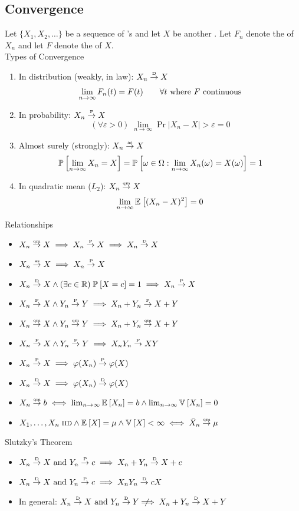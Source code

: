 \documentclass[landscape]{article}
\begin{document}
\begin{multicols*}{2}
\section{Convergence}

Let $\{X_1,X_2,\ldots\}$ be a sequence of \rv's and let $X$ be another \rv.
Let $F_n$ denote the \cdf of $X_n$ and let $F$ denote the \cdf of $X$.\\

Types of Convergence
\begin{enumerate}
  \item In distribution (weakly, in law): $X_n \dconv X$ 
    $$\limn F_n(t) = F(t) \qquad \forall t \text{ where } F \text{ continuous}$$
  \item In probability: $X_n \pconv X$ 
    $$(\forall \varepsilon > 0) \; 
    \lim_{n\to\infty} \Pr{|X_n -X| > \varepsilon} = 0$$
  \item Almost surely (strongly): $X_n \asconv X$
    $$\Pr{\limn X_n=X} = \Pr{\omega\in\Omega: \limn X_n(\omega)=X(\omega)}=1$$
  \item In quadratic mean ($L_2$): $X_n \qmconv X$
    $$\lim_{n\to\infty} \E{(X_n - X)^2} = 0$$
\end{enumerate}

Relationships
\begin{itemize}
  \item $X_n \qmconv X \imp X_n \pconv X \imp X_n \dconv X$
  \item $X_n \asconv X \imp X_n \pconv X$
  \item $X_n \dconv X \wedge (\exists c \in \R) \; \Pr{X=c} = 1
    \imp X_n \pconv X$
  \item $X_n \pconv X \wedge Y_n \pconv Y 
    \imp X_n + Y_n \pconv X + Y$
  \item $X_n \qmconv X \wedge Y_n \qmconv Y 
    \imp X_n + Y_n \qmconv X + Y$
  \item $X_n \pconv X \wedge Y_n \pconv Y 
    \imp X_nY_n \pconv XY$
  \item $X_n \pconv X \imp \transform(X_n) \pconv \transform(X)$
  \item $X_n \dconv X \imp \transform(X_n) \dconv \transform(X)$
  \item $X_n \qmconv b \eqv \lim_{n\to\infty} \E{X_n}=b 
    \wedge \lim_{n\to\infty} \V{X_n} = 0$
  \item $X_1,\dots,X_n\; \iid \wedge \E{X}=\mu \wedge \V{X}<\infty
    \eqv \samplemean \qmconv \mu$
\end{itemize}

Slutzky's Theorem
\begin{itemize}
  \item $X_n \dconv X \text{ and } Y_n \pconv c 
    \imp X_n + Y_n \dconv X + c$
  \item $X_n \dconv X \text{ and } Y_n \pconv c 
    \imp X_nY_n \dconv cX$
  \item In general: $X_n \dconv X \text{ and } Y_n \dconv Y
    \nimp X_n + Y_n \dconv X + Y$
\end{itemize}


\end{multicols*}
\end{document}

